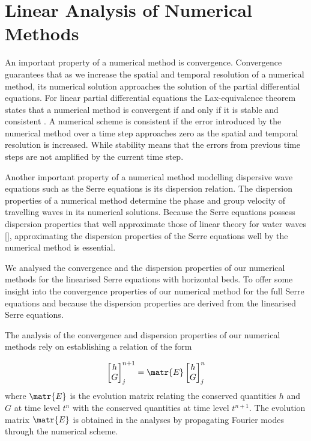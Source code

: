 
\chapter{Linear Analysis of Numerical Methods}
\label{chp:AnalNumMethod}
An important property of a numerical method is convergence. Convergence guarantees that as we increase the spatial and temporal resolution of a numerical method, its numerical solution approaches the solution of the partial differential equations. For linear partial differential equations the Lax-equivalence theorem states that a numerical method is convergent if and only if it is stable and consistent \cite{Lax-Richtmyer-1956-267}. A numerical scheme is consistent if the error introduced by the numerical method over a time step approaches zero as the spatial and temporal resolution is increased. While stability means that the errors from previous time steps are not amplified by the current time step.

Another important property of a numerical method modelling dispersive wave equations such as the Serre equations is its dispersion relation. The dispersion properties of a numerical method determine the phase and group velocity of travelling waves in its numerical solutions. Because the Serre equations possess dispersion properties that well approximate those of linear theory for water waves [], approximating the dispersion properties of the Serre equations well by the numerical method is essential.

We analysed the convergence and the dispersion properties of our numerical methods for the linearised Serre equations with horizontal beds. To offer some insight into the convergence properties of our numerical method for the full Serre equations and because the dispersion properties are derived from the linearised Serre equations. 

The analysis of the convergence and dispersion properties of our numerical methods rely on establishing a relation of the form

\begin{equation}
\label{eqn:linearanalaim}
\begin{bmatrix}
h \\G
\end{bmatrix}^{n+1}_j = \matr{E} \begin{bmatrix}
h \\G
\end{bmatrix}^{n}_j
\end{equation}
 where $\matr{E}$ is the evolution matrix relating the conserved quantities $h$ and $G$ at time level $t^n$ with the conserved quantities at time level $t^{n+1}$. The evolution matrix $\matr{E}$ is obtained in the analyses by propagating Fourier modes through the numerical scheme. 
 
